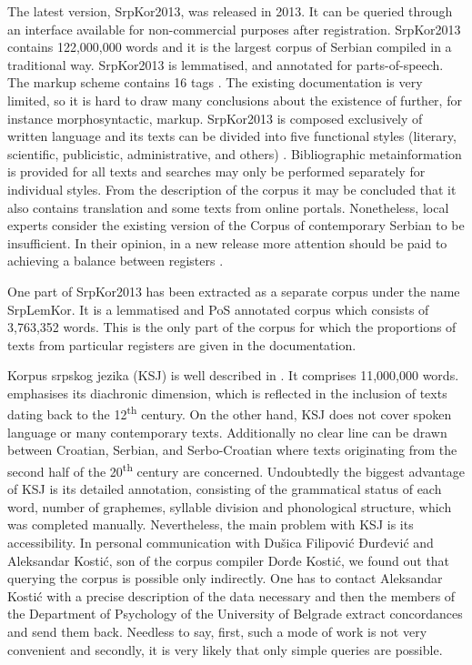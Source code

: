 \begin{sloppypar}
The latest version, SrpKor2013, was released in 2013. It can be queried through an interface available for non-commercial purposes after registration. SrpKor2013 contains 122,000,000 words and it is the largest corpus of Serbian compiled in a traditional way. SrpKor2013 is lemmatised, and annotated for parts-of-speech. The markup scheme contains 16 tags \citep[43a]{Utvic11}. The existing documentation is very limited, so it is hard to draw many conclusions about the existence of further, for instance morphosyntactic, markup. SrpKor2013 is composed exclusively of written language and its texts can be divided into five functional styles (literary, scientific, publicistic, administrative, and others) \citep[42a]{Utvic11}. Bibliographic metainformation is provided for all texts and searches may only be performed separately for individual styles. From the description of the corpus it may be concluded that it also contains translation and some texts from online portals. Nonetheless, local experts consider the existing version of the Corpus of contemporary Serbian to be insufficient. In their opinion, in a new release more attention should be paid to achieving a balance between registers \citep[42a]{Utvic11}.
\end{sloppypar}

One part of SrpKor2013 has been extracted as a separate corpus under the name SrpLemKor. It is a lemmatised and PoS annotated corpus which consists of 3,763,352 words. This is the only part of the corpus for which the proportions of texts from particular registers are given in the documentation.

Korpus srpskog jezika (KSJ) is well described in \citet{Kostic03}. It comprises 11,000,000 words. \citet[47]{Dobric09} emphasises its diachronic dimension, which is reflected in the inclusion of texts dating back to the 12\textsuperscript{th} century. On the other hand, KSJ does not cover spoken language or many contemporary texts. Additionally no clear line can be drawn between Croatian, Serbian, and Serbo-Croatian where texts originating from the second half of the 20\textsuperscript{th} century are concerned. Undoubtedly the biggest advantage of KSJ is its detailed annotation, consisting of the grammatical status of each word, number of graphemes, syllable division and phonological structure, which was completed manually. Nevertheless, the main problem with KSJ is its accessibility. In personal communication with Dušica Filipović Đurđević and Aleksandar Kostić, son of the corpus compiler Dorđe Kostić, we found out that querying the corpus is possible only indirectly. One has to contact Aleksandar Kostić with a precise description of the data necessary and then the members of the Department of Psychology of the University of Belgrade extract concordances and send them back. Needless to say, first, such a mode of work is not very convenient and secondly, it is very likely that only simple queries are possible. 

